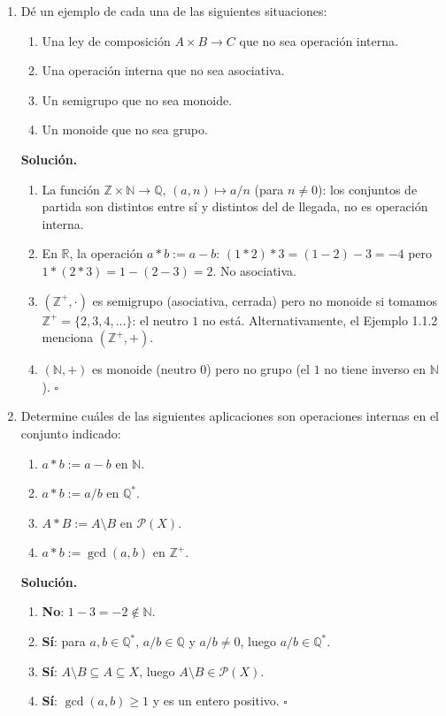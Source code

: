 \begin{enumerate}[label=\textbf{1.\arabic*.}]
\item Dé un ejemplo de cada una de las siguientes situaciones:
\begin{enumerate}[label=\alph*)]
    \item Una ley de composición \(A \times B \to C\) que no sea operación interna.
    \item Una operación interna que no sea asociativa.
    \item Un semigrupo que no sea monoide.
    \item Un monoide que no sea grupo.
\end{enumerate}

\textbf{Solución.}
\begin{enumerate}[label=\alph*)]
    \item La función \(\mathbb{Z} \times \mathbb{N} \to \mathbb{Q}\), \((a,n) \mapsto a/n\)
    (para \(n \neq 0\)): los conjuntos de partida son distintos entre sí y distintos del
    de llegada, no es operación interna.
    \item En \(\mathbb{R}\), la operación \(a * b := a - b\):
    \((1*2)*3 = (1-2)-3 = -4\) pero \(1*(2*3)=1-(2-3)=2\). No asociativa.
    \item \((\mathbb{Z}^+, \cdot)\) es semigrupo (asociativa, cerrada) pero no monoide si tomamos
    \(\mathbb{Z}^+ = \{2,3,4,\ldots\}\): el neutro \(1\) no está.
    Alternativamente, el Ejemplo 1.1.2 menciona \((\mathbb{Z}^+, +)\).
    \item \((\mathbb{N}, +)\) es monoide (neutro \(0\)) pero no grupo (el \(1\) no tiene inverso en \(\mathbb{N}\)).
    \hfill\(\square\)
\end{enumerate}

\item Determine cuáles de las siguientes aplicaciones son operaciones internas en
el conjunto indicado:
\begin{enumerate}[label=\alph*)]
    \item \(a * b := a - b\) en \(\mathbb{N}\).
    \item \(a * b := a/b\) en \(\mathbb{Q}^*\).
    \item \(A * B := A \setminus B\) en \(\mathcal{P}(X)\).
    \item \(a * b := \gcd(a,b)\) en \(\mathbb{Z}^+\).
\end{enumerate}

\textbf{Solución.}
\begin{enumerate}[label=\alph*)]
    \item \textbf{No}: \(1 - 3 = -2 \notin \mathbb{N}\).
    \item \textbf{Sí}: para \(a,b \in \mathbb{Q}^*\), \(a/b \in \mathbb{Q}\) y \(a/b \neq 0\),
    luego \(a/b \in \mathbb{Q}^*\).
    \item \textbf{Sí}: \(A \setminus B \subseteq A \subseteq X\), luego
    \(A \setminus B \in \mathcal{P}(X)\).
    \item \textbf{Sí}: \(\gcd(a,b) \geq 1\) y es un entero positivo. \hfill\(\square\)
\end{enumerate}


\end{enumerate}
